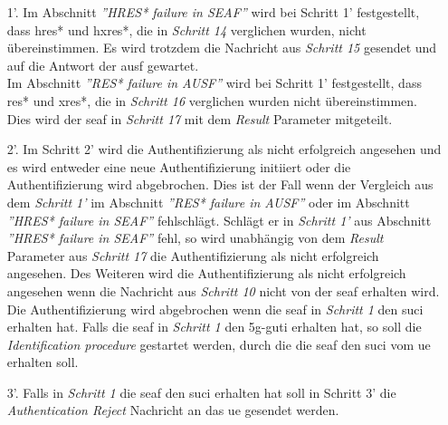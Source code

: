 \begin{enumerate}
\item[1'.] Im Abschnitt \textit{''HRES* failure in SEAF''} wird bei Schritt 1' festgestellt, dass \gls{hres*} und \gls{hxres*}, die in \textit{Schritt 14} verglichen wurden, nicht \"ubereinstimmen. 
Es wird trotzdem die Nachricht aus \textit{Schritt 15} gesendet und auf die Antwort der \gls{ausf} gewartet. \\
Im Abschnitt \textit{''RES* failure in AUSF''} wird bei Schritt 1' festgestellt, dass \gls{res*} und \gls{xres*}, die in \textit{Schritt 16} verglichen wurden nicht \"ubereinstimmen.
Dies wird der \gls{seaf} in \textit{Schritt 17} mit dem \textit{Result} Parameter mitgeteilt.

\item[2'.] Im Schritt 2' wird die Authentifizierung als nicht erfolgreich angesehen und es wird entweder eine neue Authentifizierung initiiert oder die Authentifizierung wird abgebrochen.
Dies ist der Fall wenn der Vergleich aus dem \textit{Schritt 1'} im Abschnitt \textit{''RES* failure in AUSF''} oder im Abschnitt \textit{''HRES* failure in SEAF''} fehlschl\"agt.
Schl\"agt er in \textit{Schritt 1'} aus Abschnitt \textit{''HRES* failure in SEAF''} fehl, so wird unabh\"angig von dem \textit{Result} Parameter aus \textit{Schritt 17} die Authentifizierung als nicht erfolgreich angesehen.
Des Weiteren wird die Authentifizierung als nicht erfolgreich angesehen wenn die Nachricht aus \textit{Schritt 10} nicht von der \gls{seaf} erhalten wird.
Die Authentifizierung wird abgebrochen wenn die \gls{seaf} in \textit{Schritt 1} den \gls{suci} erhalten hat.
Falls die \gls{seaf} in \textit{Schritt 1} den \gls{5g-guti} erhalten hat, so soll die \textit{Identification procedure} gestartet werden, durch die die \gls{seaf} den \gls{suci} vom \gls{ue} erhalten soll.

\item[3'.] Falls in \textit{Schritt 1} die \gls{seaf} den \gls{suci} erhalten hat soll in Schritt 3' die \textit{Authentication Reject} Nachricht an das \gls{ue} gesendet werden.
\end{enumerate}













